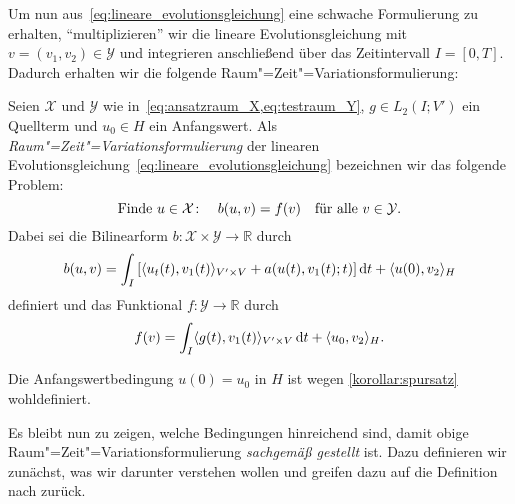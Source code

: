 Um nun aus~\cref{eq:lineare_evolutionsgleichung} eine schwache Formulierung zu erhalten, \enquote{multiplizieren} wir die lineare Evolutionsgleichung mit $v = (v_{1}, v_{2}) \in \mathcal Y$ und integrieren anschließend über das Zeitintervall $I = [0, T]$.
Dadurch erhalten wir die folgende Raum"=Zeit"=Variationsformulierung:

\begin{Definition}
\label{definition:absktrakte_raum_zeit_formulierung}
    Seien $\mathcal X$ und $\mathcal Y$ wie in~\cref{eq:ansatzraum_X,eq:testraum_Y}, $g \in L_{2}(I; V')$ ein Quellterm und $u_{0} \in H$ ein Anfangswert.
    Als \emph{Raum"=Zeit"=Variationsformulierung} der linearen Evolutionsgleichung~\cref{eq:lineare_evolutionsgleichung} bezeichnen wir das folgende Problem:
    \begin{equation}
        \label{eq:absktrakte_raum_zeit_formulierung}
        \text{Finde } u \in \mathcal X \colon \quad b(u, v) = f(v) \quad \fa v \in \mathcal Y.
    \end{equation}
    Dabei sei die Bilinearform $b \colon \mathcal X \times \mathcal Y \to \mathbb{R}$ durch
    \begin{equation}
        \label{eq:absktrakte_raum_zeit_formulierung:lhs}
        b(u, v) = \int_{I} \left[   \skp{u_{t}(t)}{v_{1}(t)}{V' \times V} + a(u(t), v_{1}(t); t)  \right] \diff t + \skp{u(0)}{v_{2}}{H}
    \end{equation}
    definiert und das Funktional $f \colon \mathcal Y \to \mathbb{R}$ durch
    \begin{equation}
        \label{eq:absktrakte_raum_zeit_formulierung:rhs}
        f(v) = \int_{I} \skp{g(t)}{v_{1}(t)}{V' \times V} \diff t + \skp{u_{0}}{v_{2}}{H}.
    \end{equation}
\end{Definition}

\begin{Bemerkung}
    Die Anfangswertbedingung $u(0) = u_{0}$ in $H$ ist wegen \cref{korollar:spursatz} wohldefiniert.
\end{Bemerkung}

Es bleibt nun zu zeigen, welche Bedingungen hinreichend sind, damit obige Raum"=Zeit"=Variationsformulierung \emph{sachgemäß gestellt} ist.
Dazu definieren wir zunächst, was wir darunter verstehen wollen und greifen dazu auf die Definition nach \textcite{hadamard1902problemes} zurück.

